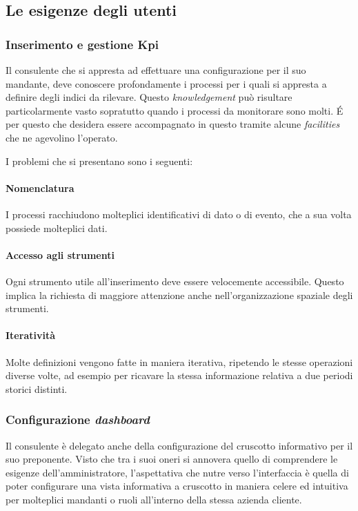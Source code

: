 \subsection{Le esigenze degli utenti}
\subsubsection{Inserimento e gestione Kpi}
Il consulente che si appresta ad effettuare una configurazione per il suo mandante, deve conoscere profondamente i processi per i quali si appresta a definire degli indici da rilevare. Questo \textit{knowledgement} può risultare particolarmente vasto sopratutto quando i processi da monitorare sono molti. \'E per questo che desidera essere accompagnato in questo tramite alcune \textit{facilities} che ne agevolino l'operato.

I problemi che si presentano sono i seguenti:
\paragraph{Nomenclatura} I processi racchiudono molteplici identificativi di dato o di evento, che a sua volta possiede molteplici dati.
\paragraph{Accesso agli strumenti} Ogni strumento utile all'inserimento deve essere velocemente accessibile. Questo implica la richiesta di maggiore attenzione anche nell'organizzazione spaziale degli strumenti.
\paragraph{Iteratività} Molte definizioni vengono fatte in maniera iterativa, ripetendo le stesse operazioni diverse volte, ad esempio per ricavare la stessa informazione relativa a due periodi storici distinti.

\subsubsection{Configurazione \textit{dashboard}}
Il consulente è delegato anche della configurazione del cruscotto informativo per il suo preponente. Visto che tra i suoi oneri si annovera quello di comprendere le esigenze dell'amministratore, l'aspettativa che nutre verso l'interfaccia è quella di poter configurare una vista informativa a cruscotto in maniera celere ed intuitiva per molteplici mandanti o ruoli all'interno della stessa azienda cliente.

